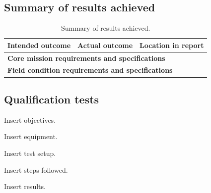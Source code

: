 
\subsection{Summary of results achieved} %

\begin{table}[h]
\centering
\fontsize{10}{12}\selectfont
\begin{tabularx}{\linewidth}{|X|X|X|}
\hline 
\textbf{Intended outcome} & \textbf{Actual outcome} & \textbf{Location in report} \\
\hline 
\multicolumn{3}{|l|}{\textbf{Core mission requirements and specifications}} \\

\hline 
\multicolumn{3}{|l|}{\textbf{Field condition requirements and specifications}} \\
\hline 
\end{tabularx}
\caption{Summary of results achieved.}
\label{tab:ResultsSummary}
\end{table}
    
\subsection{Qualification tests} %




            Insert objectives. 
    
            
            Insert equipment. 
        

            Insert test setup. 
    

            Insert steps followed. 
     

            Insert results. 
        

